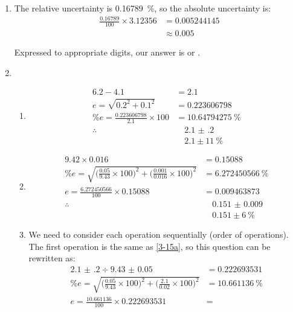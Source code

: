 \documentclass{article}
\begin{document}
\begin{enumerate}[start=14]
	\item The relative uncertainty is \SI{0.16789}{\percent}, so the absolute uncertainty is:
		\begin{align*}
			\frac{\num{0.16789}}{100} \times \num{3.12356} &= \num{0.005244145} \\
			&\approx \num{0.005}
		\end{align*}

		Expressed to appropriate digits, our answer is  or
		.
	\item \begin{enumerate}
		\item\label{3-15a} \begin{align*}
				6.2 - 4.1 &= 2.1 \\
				e = \sqrt{0.2^2 + 0.1^2} &= \num{0.223606798} \\
				\%e = \frac{\num{0.223606798}}{2.1} \times 100 &= \SI{10.64794275}{\percent} \\
				\therefore &\quad \boxed{\num{2.1(2)}} \\
				&\quad \boxed{\num{2.1} \pm \SI{11}{\percent}}
			\end{align*}
		\item \begin{align*}
				9.42 \times 0.016 &= \num{0.15088} \\
				\%e = \sqrt{\bigg(\frac{0.05}{9.43}\times 100 \bigg)^2
					+ \bigg(\frac{0.001}{0.016}\times 100 \bigg)^2
				} &= \SI{6.272450566}{\percent} \\
				e = \frac{\num{6.272450566}}{100} \times \num{0.15088} &=
				\num{0.009463873} \\
				\therefore &\quad \boxed{\num{0.151(9)}} \\
				&\quad \boxed{\num{0.151} \pm \SI{6}{\percent}}
			\end{align*}
		\item We need to consider each operation sequentially (order of
			operations). The first operation is the same as
			\ref{3-15a}, so this question can be rewritten as:
			\begin{align*}
				\num{2.1(2)} \div \num{9.43(5)} &= \num{0.222693531} \\
				\%e = \sqrt{\bigg(\frac{0.05}{9.43}\times 100 \bigg)^2
					+ \bigg(\frac{2.1}{0.02}\times 100 \bigg)^2
				} &= \SI{10.661136}{\percent} \\
				e = \frac{\num{10.661136}}{100} \times \num{0.222693531} &=

\end{align*}
\end{enumerate}
\end{enumerate}
\end{document}
